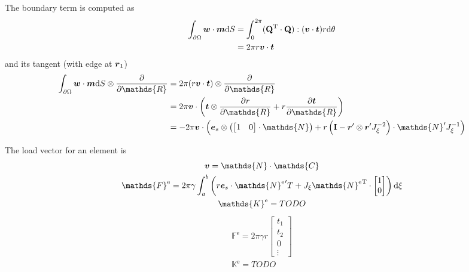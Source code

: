 \documentclass[a4paper,11pt]{article}
\renewcommand{\to}[1]{\text{\boldmath $#1$}} %
\newcommand{\ts}[1]{\text{\boldmath $\mathrm{#1}$}} %
\newcommand{\uv}[1]{\mathds{#1}}
\newcommand{\um}[1]{\mathds{#1}}
\newcommand{\intd}[1]{\mathrm{d}#1}
\newcommand{\pderiv}[2]{\frac{\partial#1}{\partial#2}}
\newcommand{\T}{\mathrm{T}}
\newcommand{\element}{\mathrm{e}}
\begin{document}
The boundary term is computed as
\begin{align}
 \int_{\partial\Omega} \to w\cdot\to m\intd S &= \int_0^{2\pi} (\ts Q^\T\cdot \ts Q):(\to v\cdot\to t) r \intd \theta\\
  &= 2\pi r \to v \cdot \to t
\end{align}
and its tangent (with edge at $\to r_1$)
\begin{align}
 \int_{\partial\Omega} \to w\cdot\to m\intd S \otimes \pderiv{}{\uv R} &= 2\pi (r \to v \cdot \to t)\otimes \pderiv{}{\uv R}\\
  &= 2 \pi \to v\cdot\left(\to t\otimes\pderiv{r}{\uv R} + r \pderiv{\to t}{\uv R}\right)\\
  &= -2 \pi \to v\cdot\left(\to e_s\otimes\left(\begin{bmatrix}1&0\end{bmatrix}\cdot\um N\right) + r \left(\ts I-\to r'\otimes\to r' J_\xi^{-2}\right)\cdot \um N' J_\xi^{-1}\right)
\end{align}

The load vector for an element is
\begin{gather}
 \to v = \um{N}\cdot\um{C}\\
 \uv F^\element = 2\pi \gamma \int_a^b \left(r\to e_s\cdot{\um N^\element}'^\T + J_\xi{\um N^\element}^\T\cdot\begin{bmatrix}1\\0\end{bmatrix}\right) \intd\xi\\
 \um K^\element = TODO
\end{gather}
\begin{gather}
 \uv F^\element = 2\pi \gamma r \begin{bmatrix}t_1\\t_2\\0\\\vdots\end{bmatrix}\\
 \um K^\element = TODO
\end{gather}
\end{document}
